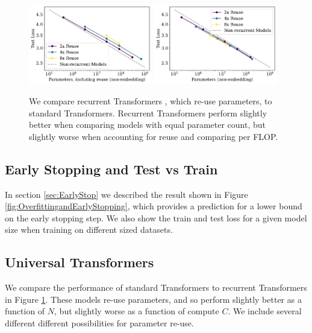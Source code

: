 \documentclass[english]{article}
\begin{document}
\begin{figure}
\noindent \centering{} 
\includegraphics[width=0.48\textwidth]{ComputeVsParamswithUTNoReuse}\hfill
\includegraphics[width=0.48\textwidth]{ComputeVsParamswithUTWithReuse}
\caption[Universal transformers]{We compare recurrent Transformers \cite{DBLP:journals/corr/abs-1807-03819}, which re-use parameters, to standard Transformers. Recurrent Transformers perform slightly better when comparing models with equal parameter count, but slightly worse when accounting for reuse and comparing per FLOP. \label{fig:RecurrentTransformers}}
\end{figure}



\subsection{Early Stopping and Test vs Train}
\label{sec:OverfittingandEarlyStopping}

In section \ref{sec:EarlyStop} we described the result shown in Figure \ref{fig:OverfittingandEarlyStopping}, which provides a prediction for a lower bound on the early stopping step.  We also show the train and test loss for a given model size when training on different sized datasets.  


\subsection{Universal Transformers}

We  compare the performance of standard Transformers  to recurrent Transformers \cite{DBLP:journals/corr/abs-1807-03819} in Figure \ref{fig:RecurrentTransformers}.  These models re-use parameters, and so perform slightly better as a function of $N$, but slightly worse as a function of compute $C$.  We include several different different possibilities for parameter re-use.
\end{document}
